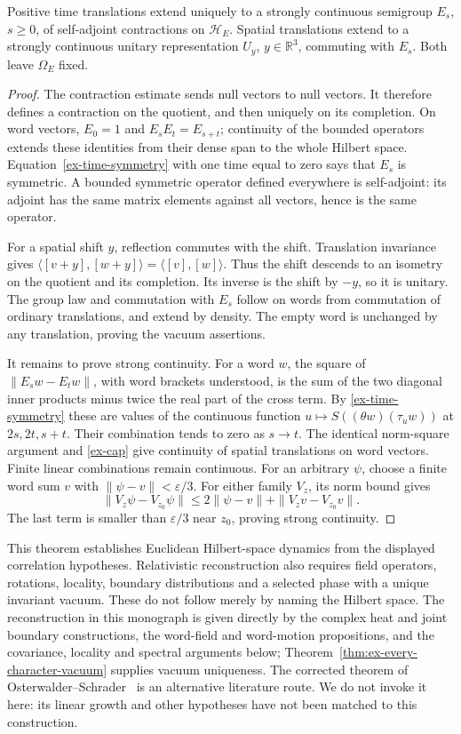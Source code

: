 \begin{theorem}\label{ex-euclidean-semigroup}
Positive time translations extend uniquely to a strongly continuous
semigroup \(E_s\), \(s\ge0\), of self-adjoint contractions on
\(\mathcal H_E\). Spatial translations extend to a strongly continuous
unitary representation \(U_y\), \(y\in\mathbb R^3\), commuting with
\(E_s\). Both leave \(\Omega_E\) fixed.
\end{theorem}
\begin{proof}
The contraction estimate sends null vectors to null vectors. It therefore
defines a contraction on the quotient, and then uniquely on its completion.
On word vectors, \(E_0=1\) and \(E_sE_t=E_{s+t}\); continuity of the
bounded operators extends these identities from their dense span to the
whole Hilbert space. Equation~\eqref{ex-time-symmetry} with one time
equal to zero says that \(E_s\) is symmetric. A bounded symmetric operator
defined everywhere is self-adjoint: its adjoint has the same matrix
elements against all vectors, hence is the same operator.

For a spatial shift \(y\), reflection commutes with the shift. Translation
invariance gives
\(\langle[v+y],[w+y]\rangle=\langle[v],[w]\rangle\).
Thus the shift descends to an isometry on the quotient and its completion.
Its inverse is the shift by \(-y\), so it is unitary. The group law and
commutation with \(E_s\) follow on words from commutation of ordinary
translations, and extend by density. The empty word is unchanged by any
translation, proving the vacuum assertions.

It remains to prove strong continuity. For a word \(w\), the square of
\(\|E_sw-E_tw\|\), with word brackets understood, is the sum of the
two diagonal inner products minus twice the real part of the cross term.
By \eqref{ex-time-symmetry} these are values of the continuous function
\(u\mapsto S((\theta w)(\tau_uw))\) at \(2s,2t,s+t\).
Their combination tends to zero as \(s\to t\). The identical norm-square
argument and \eqref{ex-cap} give continuity of spatial translations on
word vectors. Finite linear combinations remain continuous.
For an arbitrary \(\psi\), choose a finite word sum \(v\) with
\(\|\psi-v\|<\varepsilon/3\). For either family \(V_z\), its norm
bound gives
\[
 \|V_z\psi-V_{z_0}\psi\|
 \le2\|\psi-v\|+\|V_zv-V_{z_0}v\|.
\]
The last term is smaller than \(\varepsilon/3\) near \(z_0\), proving
strong continuity.
\end{proof}

This theorem establishes Euclidean Hilbert-space dynamics from the displayed
correlation hypotheses. Relativistic reconstruction also requires field
operators, rotations, locality, boundary distributions and a selected phase
with a unique invariant vacuum. These do not follow merely by naming the
Hilbert space. The reconstruction in this monograph is given directly by the complex
heat and joint boundary constructions, the word-field and word-motion
propositions, and the covariance, locality and spectral arguments below;
Theorem~\ref{thm:ex-every-character-vacuum} supplies vacuum uniqueness.
The corrected theorem of Osterwalder--Schrader~\cite[\S IV.1]{OS75}
is an alternative literature route. We do not invoke it here: its linear
growth and other hypotheses have not been matched to this construction.
